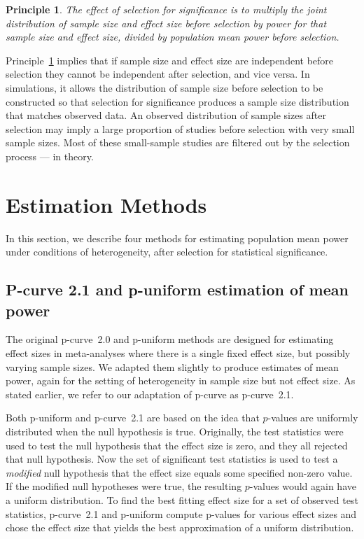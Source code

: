 \documentclass[jou]{apa6} %
\newtheorem{princ}{Principle}
\begin{document}
\begin{princ} \label{jointNes}
The effect of selection for significance is to multiply the joint distribution of sample size and effect size before selection by power for that sample size and effect size, divided by population mean power before selection.
\end{princ}

Principle~\ref{jointNes} implies that if sample size and effect size are independent before selection they cannot be independent after selection, and vice versa. In simulations, it allows the distribution of sample size before selection to be constructed so that selection for significance produces a sample size distribution that matches observed data. An observed distribution of sample sizes after selection may imply a large proportion of studies before selection with very small sample sizes. Most of these small-sample studies are filtered out by the selection process --- in theory. 

\section{Estimation Methods} \label{METHODS}

In this section, we describe four methods for estimating population mean power under conditions of heterogeneity, after selection for statistical significance. 

\subsection{P-curve 2.1 and p-uniform estimation of mean power} \label{PCU}
The original p-curve~2.0 \parencite{SimonsohnEtAl2014b} and p-uniform \parencite{vanAssenEtAl2014} methods are  designed for estimating effect sizes in meta-analyses where there is a single fixed effect size, but possibly varying sample sizes. We adapted them slightly to produce estimates of mean power, again for the setting of heterogeneity in sample size but not effect size. As stated earlier, we refer to our adaptation of p-curve as p-curve~2.1.

Both p-uniform and p-curve~2.1 are based on the idea that $p$-values are uniformly distributed when the null hypothesis is true. Originally, the test statistics were used to test the null hypothesis that the effect size is zero, and they all rejected that null hypothesis.  Now the set of significant test statistics is used to test a \emph{modified} null hypothesis that the effect size equals some specified non-zero value. If the modified null hypotheses were true, the resulting $p$-values would again have a uniform distribution. To find the best fitting effect size for a set of observed test statistics, p-curve~2.1 and p-uniform compute p-values for various effect sizes and chose the effect size that yields the best approximation of a uniform distribution. %
\end{document}
